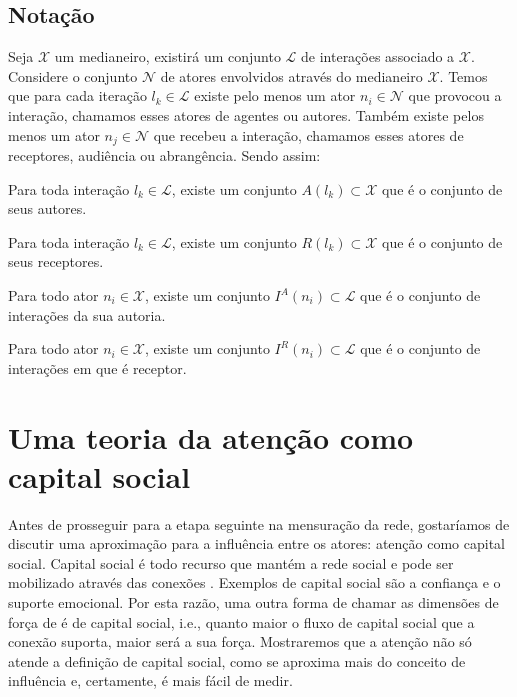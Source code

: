 \subsection{Notação}

Seja $\mathscr{X}$ um medianeiro, existirá um conjunto $\mathscr{L}$ de
interações associado a $\mathscr{X}$. Considere o conjunto $\mathscr{N}$ de
atores envolvidos através do medianeiro $\mathscr{X}$. Temos que para cada
iteração $l_k \in \mathscr{L}$ existe pelo menos um ator $n_i \in \mathscr{N}$
que provocou a interação, chamamos esses atores de agentes ou autores. Também
existe pelos menos um ator $n_j \in \mathscr{N}$ que recebeu a interação,
chamamos esses atores de receptores, audiência ou abrangência. Sendo assim:

\begin{Def}
Para toda interação $l_k \in \mathscr{L}$, existe um conjunto $A(l_k) \subset
\mathscr{X}$ que é o conjunto de seus autores.
\end{Def} 
\begin{Def}
Para toda interação $l_k \in \mathscr{L}$, existe um conjunto $R(l_k) \subset
\mathscr{X}$ que é o conjunto de seus receptores.
\end{Def} 
\begin{Def}
Para todo ator $n_i \in \mathscr{X}$, existe um conjunto $I^A(n_i)
\subset \mathscr{L}$ que é o conjunto de interações da sua autoria.
\end{Def} 
\begin{Def}
Para todo ator $n_i \in \mathscr{X}$, existe um conjunto $I^R(n_i)
\subset \mathscr{L}$ que é o conjunto de interações em que é receptor.
\end{Def} 

\section{Uma teoria da atenção como capital social}
\label{sec:teoria_atencao}

Antes de prosseguir para a etapa seguinte na mensuração da rede, gostaríamos de
discutir uma aproximação para a influência entre os atores: atenção como capital
social. Capital social é todo recurso que mantém a rede social
\citep{Coleman1988} e pode ser mobilizado através das conexões
\citep{Gyarmati2004}. Exemplos de capital social são a confiança e o suporte
emocional. Por esta razão, uma outra forma de chamar as dimensões de força de
\citeauthor{Granovetter1973} é de capital social, i.e., quanto maior o fluxo de
capital social que a conexão suporta, maior será a sua força. Mostraremos que a
atenção não só atende a definição de capital social, como se aproxima mais do
conceito de influência e, certamente, é mais fácil de medir.

